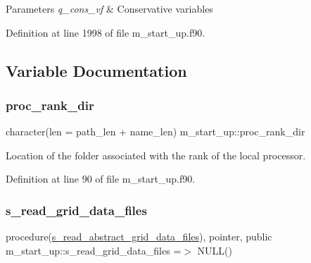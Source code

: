 \begin{DoxyParams}{Parameters}
{\em q\+\_\+cons\+\_\+vf} & Conservative variables \\
\hline
\end{DoxyParams}


Definition at line 1998 of file m\+\_\+start\+\_\+up.\+f90.



\subsection{Variable Documentation}
\mbox{\label{namespacem__start__up_a15a1dec84d62ebf0216c78f9cbdd3d73}} 
\subsubsection{\texorpdfstring{proc\+\_\+rank\+\_\+dir}{proc\_rank\_dir}}
{\footnotesize\ttfamily character(len = path\+\_\+len + name\+\_\+len) m\+\_\+start\+\_\+up\+::proc\+\_\+rank\+\_\+dir}



Location of the folder associated with the rank of the local processor. 



Definition at line 90 of file m\+\_\+start\+\_\+up.\+f90.

\mbox{\label{namespacem__start__up_af646e0769cd88c45b2acfc47a3b15d7b}} 
\subsubsection{\texorpdfstring{s\+\_\+read\+\_\+grid\+\_\+data\+\_\+files}{s\_read\_grid\_data\_files}}
{\footnotesize\ttfamily procedure(\hyperlink{interfacem__start__up_1_1s__read__abstract__grid__data__files}{s\+\_\+read\+\_\+abstract\+\_\+grid\+\_\+data\+\_\+files}), pointer, public m\+\_\+start\+\_\+up\+::s\+\_\+read\+\_\+grid\+\_\+data\+\_\+files =$>$ N\+U\+LL()}



